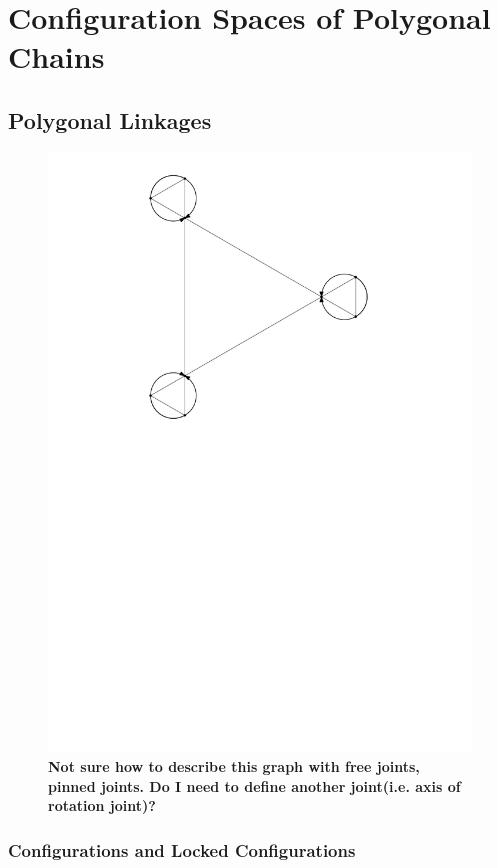 \section{Configuration Spaces of Polygonal Chains}
\subsection{Polygonal Linkages}
\begin{figure}[!ht]
\begin{center}
\includegraphics[scale=.5]{graphics/PolygonalLinkageWithConfigurationSpace.pdf}
\end{center} 
\caption{\textbf{Not sure how to describe this graph with free joints, pinned joints.  Do I need to define another joint(i.e. axis of rotation joint)?}}
\end{figure}
\subsubsection{Configurations and Locked Configurations}
